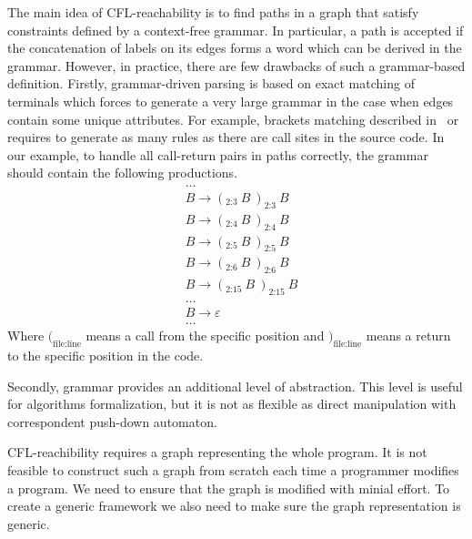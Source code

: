 The main idea of CFL-reachability is to find paths in a graph that satisfy constraints defined by a context-free grammar.
In particular, a path is accepted if the concatenation of labels on its edges forms a word which can be derived in the grammar.
However, in practice, there are few drawbacks of such a grammar-based definition.
Firstly, grammar-driven parsing is based on exact matching of terminals which forces to generate a very large grammar in the case when edges contain some unique attributes.
For example, brackets matching described in~\cite{CFLr} or~\cite{Zheng, JavaCFL} requires to generate as many rules as there are call sites in the source code.
In our example, to handle all call-return pairs in paths correctly, the grammar should contain the following productions.
\begin{equation}
	\begin{split}
		& \ldots \\
		& B \rightarrow (_\text{2:3}\ B\  )_\text{2:3}\ B \\
		& B \rightarrow (_\text{2:4}\ B\  )_\text{2:4}\ B \\
		& B \rightarrow (_\text{2:5}\ B\  )_\text{2:5}\ B \\
		& B \rightarrow (_\text{2:6}\ B\  )_\text{2:6}\ B \\
		& B \rightarrow (_\text{2:15}\ B\ )_\text{2:15}\ B \\
		& \ldots \\
		& B \rightarrow \varepsilon \\
		& \ldots
	\end{split}
\end{equation}
Where $(_{\text{file}:\text{line}}$ means a call from the specific position and $)_{\text{file}:\text{line}}$ means a return to the specific position in the code.  

Secondly, grammar provides an additional level of abstraction.
This level is useful for algorithms formalization, but it is not as flexible as direct manipulation with correspondent push-down automaton.

CFL-reachibility requires a graph representing the whole program.
It is not feasible to construct such a graph from scratch each time a programmer modifies a program.
We need to ensure that the graph is modified with minial effort.
To create a generic framework we also need to make sure the graph representation is generic.

